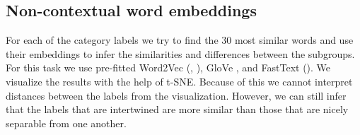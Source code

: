 \documentclass[fleqn,moreauthors,10pt]{ds_report}
\begin{document}
\subsection*{Non-contextual word embeddings}
For each of the category labels we try to find the $30$ most similar words and use their embeddings to infer the similarities and differences between the subgroups. For this task we use pre-fitted Word2Vec (\cite{mikolov2013efficient}, \cite{mikolov2013distributed}), GloVe \cite{pennington2014glove}, and FastText (\cite{bojanowski2016enriching}). We visualize the results with the help of t-SNE. Because of this we cannot interpret distances between the labels from the visualization. However, we can still infer that the labels that are intertwined are more similar than those that are nicely separable from one another. %

\end{document}
